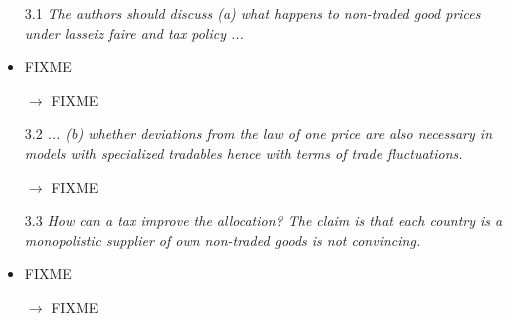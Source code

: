 \begin{itemize}
\item[3.1] \textit{The authors should discuss (a) what happens to
    non-traded good prices under lasseiz faire and tax policy ...}

\item FIXME

\item[$\rightarrow $] FIXME

\item[3.2] \textit{... (b) whether deviations from the law of one
    price are also necessary in models with specialized tradables
    hence with terms of trade fluctuations.}

\item[$\rightarrow $] FIXME

\item[3.3] \textit{How can a tax improve the allocation? The claim is
    that each country is a monopolistic supplier of own non-traded
    goods is not convincing.}

\item FIXME

\item[$\rightarrow $] FIXME

\end{itemize}

\newpage

 

